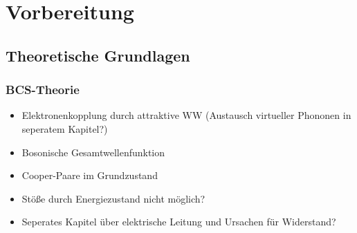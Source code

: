 \chapter{Vorbereitung}

	\section{Theoretische Grundlagen}
	
	\subsection{BCS-Theorie}

\begin{itemize}
    \item Elektronenkopplung durch attraktive WW (Austausch virtueller Phononen in
	    seperatem Kapitel?)
    \item Bosonische Gesamtwellenfunktion
    \item Cooper-Paare im Grundzustand
    \item Stöße durch Energiezustand nicht möglich?
    \item Seperates Kapitel über elektrische Leitung und Ursachen für Widerstand?
\end{itemize}
